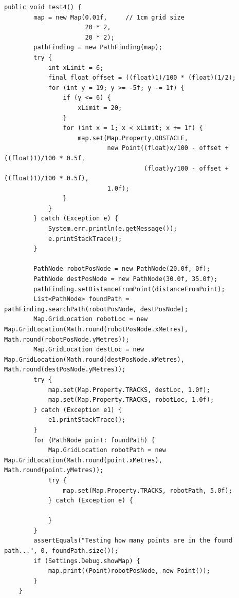 \documentclass[12pt,a4paper]{article}
\begin{document}
    \begin{lstlisting}[caption=PathFinding automated test suite 4, captionpos=b, label={lst:PathFindingAutomatedTestSuite4}]
    public void test4() {
		map = new Map(0.01f,     // 1cm grid size
 			   		  20 * 2,    
 			   		  20 * 2);
		pathFinding = new PathFinding(map);
		try {
			int xLimit = 6;
			final float offset = ((float)1)/100 * (float)(1/2);
			for (int y = 19; y >= -5f; y -= 1f) {
				if (y <= 6) {
					xLimit = 20;
				}
				for (int x = 1; x < xLimit; x += 1f) {
					map.set(Map.Property.OBSTACLE, 
							new Point((float)x/100 - offset + ((float)1)/100 * 0.5f, 
									  (float)y/100 - offset + ((float)1)/100 * 0.5f), 
							1.0f);
				}
			}
		} catch (Exception e) {
			System.err.println(e.getMessage());
			e.printStackTrace();
		}
		
		PathNode robotPosNode = new PathNode(20.0f, 0f);
		PathNode destPosNode = new PathNode(30.0f, 35.0f);
		pathFinding.setDistanceFromPoint(distanceFromPoint);
		List<PathNode> foundPath = pathFinding.searchPath(robotPosNode, destPosNode);
		Map.GridLocation robotLoc = new Map.GridLocation(Math.round(robotPosNode.xMetres), Math.round(robotPosNode.yMetres));
		Map.GridLocation destLoc = new Map.GridLocation(Math.round(destPosNode.xMetres), Math.round(destPosNode.yMetres));
		try {
			map.set(Map.Property.TRACKS, destLoc, 1.0f);
			map.set(Map.Property.TRACKS, robotLoc, 1.0f);
		} catch (Exception e1) {
			e1.printStackTrace();
		}
		for (PathNode point: foundPath) {
			Map.GridLocation robotPath = new Map.GridLocation(Math.round(point.xMetres), Math.round(point.yMetres));
			try {
				map.set(Map.Property.TRACKS, robotPath, 5.0f);
			} catch (Exception e) {
				
			}
		}
		assertEquals("Testing how many points are in the found path...", 0, foundPath.size());
		if (Settings.Debug.showMap) {
			map.print((Point)robotPosNode, new Point());
		}
	}
     \end{lstlisting}
     
\end{document}
